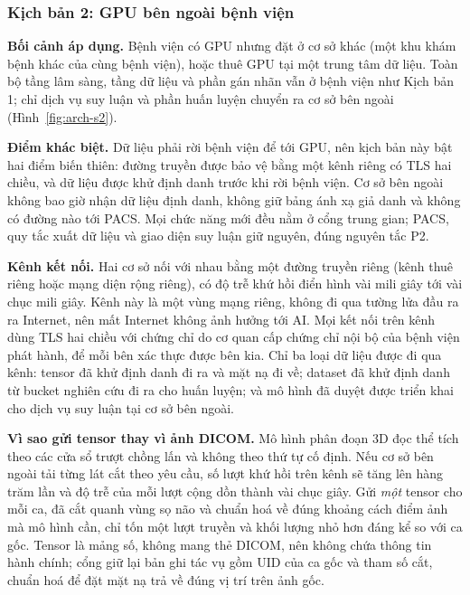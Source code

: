 \subsubsection{Kịch bản 2: GPU bên ngoài bệnh viện}
\label{sec:scenario2}

\textbf{Bối cảnh áp dụng.} Bệnh viện có GPU nhưng đặt ở cơ sở khác (một khu khám bệnh
khác của cùng bệnh viện), hoặc thuê GPU tại một trung tâm dữ liệu. Toàn bộ tầng lâm
sàng, tầng dữ liệu và phần gán nhãn vẫn ở bệnh viện như Kịch bản 1; chỉ dịch vụ suy luận
và phần huấn luyện chuyển ra cơ sở bên ngoài (Hình~\ref{fig:arch-s2}).

\textbf{Điểm khác biệt.} Dữ liệu phải rời bệnh viện để tới GPU, nên kịch bản này bật
hai điểm biến thiên: đường truyền được bảo vệ bằng một kênh riêng có TLS hai chiều, và
dữ liệu được khử định danh trước khi rời bệnh viện. Cơ sở bên ngoài không bao giờ nhận
dữ liệu định danh, không giữ bảng ánh xạ giả danh và không có đường nào tới PACS. Mọi
chức năng mới đều nằm ở cổng trung gian; PACS, quy tắc xuất dữ liệu và giao diện suy luận
giữ nguyên, đúng nguyên tắc P2.

\textbf{Kênh kết nối.} Hai cơ sở nối với nhau bằng một đường truyền riêng (kênh thuê
riêng hoặc mạng diện rộng riêng), có độ trễ khứ hồi điển hình vài mili giây tới vài chục
mili giây. Kênh này là một vùng mạng riêng, không đi qua tường lửa đầu ra ra Internet, nên
mất Internet không ảnh hưởng tới AI. Mọi kết nối trên kênh dùng TLS hai chiều với chứng
chỉ do cơ quan cấp chứng chỉ nội bộ của bệnh viện phát hành, để mỗi bên xác thực được bên
kia. Chỉ ba loại dữ liệu được đi qua kênh: tensor đã khử định danh đi ra và mặt nạ đi về;
dataset đã khử định danh từ bucket nghiên cứu đi ra cho huấn luyện; và mô hình đã duyệt
được triển khai cho dịch vụ suy luận tại cơ sở bên ngoài.

\textbf{Vì sao gửi tensor thay vì ảnh DICOM.} Mô hình phân đoạn 3D đọc thể tích theo các
cửa sổ trượt chồng lấn và không theo thứ tự cố định. Nếu cơ sở bên ngoài tải từng lát cắt
theo yêu cầu, số lượt khứ hồi trên kênh sẽ tăng lên hàng trăm lần và độ trễ của mỗi lượt
cộng dồn thành vài chục giây. Gửi \emph{một} tensor cho mỗi ca, đã cắt quanh vùng sọ não
và chuẩn hoá về đúng khoảng cách điểm ảnh mà mô hình cần, chỉ tốn một lượt truyền và
khối lượng nhỏ hơn đáng kể so với ca gốc. Tensor là mảng số, không mang thẻ DICOM, nên
không chứa thông tin hành chính; cổng giữ lại bản ghi tác vụ gồm UID của ca gốc và tham
số cắt, chuẩn hoá để đặt mặt nạ trả về đúng vị trí trên ảnh gốc.

